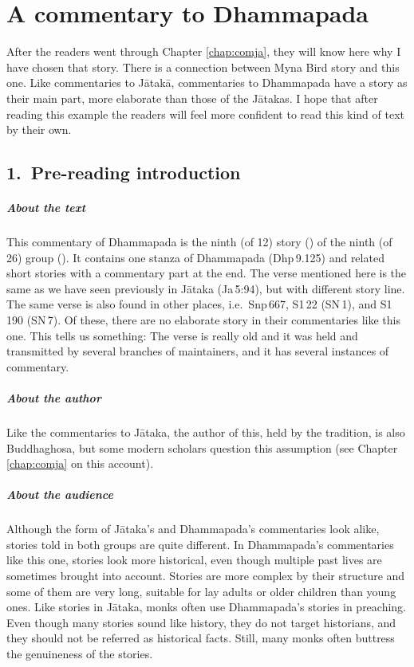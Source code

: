 \chapter{A commentary to Dhammapada}\label{chap:comdham}

After the readers went through Chapter \ref{chap:comja}, they will know here why I have chosen that story. There is a connection between Myna Bird story and this one. Like commentaries to J\=atak\=a, commentaries to Dhammapada have a story as their main part, more elaborate than those of the J\=atakas. I hope that after reading this example the readers will feel more confident to read this kind of text by their own.

{}
\section*{1.\ Pre-reading introduction}

\paragraph*{About the text} This commentary of Dhammapada is the ninth (of 12) story () of the ninth (of 26) group (). It contains one stanza of Dhammapada (Dhp\,9.125) and related short stories with a commentary part at the end. The verse mentioned here is the same as we have seen previously in J\=ataka (Ja\,5:94), but with different story line. The same verse is also found in other places, i.e.\ Snp\,667, S1\,22 (SN\,1), and S1\,190 (SN\,7). Of these, there are no elaborate story in their commentaries like this one. This tells us something: The verse is really old and it was held and transmitted by several branches of maintainers, and it has several instances of commentary.

\paragraph*{About the author} Like the commentaries to J\=ataka, the author of this, held by the tradition, is also Buddhaghosa, but some modern scholars question this assumption (see Chapter \ref{chap:comja} on this account).

\paragraph*{About the audience} Although the form of J\=ataka's and Dhammapada's commentaries look alike, stories told in both groups are quite different. In Dhammapada's commentaries like this one, stories look more historical, even though multiple past lives are sometimes brought into account. Stories are more complex by their structure and some of them are very long, suitable for lay adults or older children than young ones. Like stories in J\=ataka, monks often use Dhammapada's stories in preaching.  Even though many stories sound like history, they do not target historians, and they should not be referred as historical facts. Still, many monks often buttress the genuineness of the stories.
 
